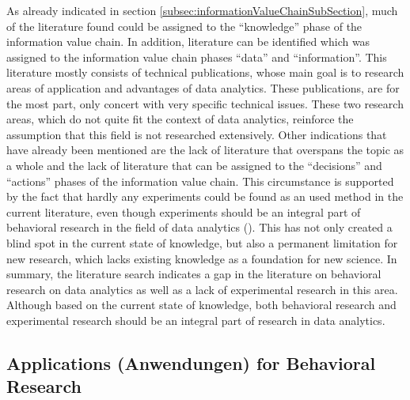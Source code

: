 As already indicated in section \ref{subsec:informationValueChainSubSection}, much of the literature found could be assigned to the \enquote{knowledge} phase of the information value chain. %
In addition, literature can be identified which was assigned to the information value chain phases \enquote{data} and \enquote{information}. This literature mostly consists of technical publications, whose main goal is to research areas of application and advantages of data analytics. These publications, are for the most part, only concert with very specific technical issues. These two research areas, which do not quite fit the context of data analytics, reinforce the assumption that this field is not researched extensively. Other indications that have already been mentioned are the lack of literature that overspans the topic as a whole and the lack of literature that can be assigned to the \enquote{decisions} and \enquote{actions} phases of the information value chain. This circumstance is supported by the fact that hardly any experiments could be found as an used method in the current literature, even though experiments should be an integral part of behavioral research in the field of data analytics (\cite{Gniewosz.2011}). This has not only created a blind spot in the current state of knowledge, but also a permanent limitation for new research, which lacks existing knowledge as a foundation for new science. %
In summary, the literature search indicates a gap in the literature on behavioral research on data analytics as well as a lack of experimental research in this area. Although based on the current state of knowledge, both behavioral research and experimental research should be an integral part of research in data analytics.

\subsection{Applications (Anwendungen) for Behavioral Research}


